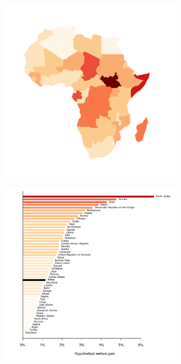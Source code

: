 \documentclass[11pt, oneside]{article}   	%
\begin{document}

\begin{figure}[!ph]
\centering
\caption{African countries by network inefficiency}
\begin{subfigure}[c]{0.44\textwidth}
\includegraphics[width=\textwidth,trim={5cm 4cm 6cm 7cm},clip]{../../Analysis/output/zeta_heatmaps/African_countries_zeta.png}
\end{subfigure}
\begin{subfigure}[c]{0.55\textwidth}
\includegraphics[width=\textwidth]{../../Analysis/output/descriptives/country_barchart.pdf}
\end{subfigure}


\end{figure}
\end{document}

